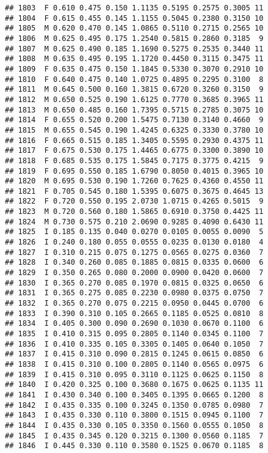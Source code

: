 \documentclass[
]{article}
\begin{document}
\begin{verbatim}
## 1803  F 0.610 0.475 0.150 1.1135 0.5195 0.2575 0.3005 11
## 1804  F 0.615 0.455 0.145 1.1155 0.5045 0.2380 0.3150 10
## 1805  M 0.620 0.470 0.145 1.0865 0.5110 0.2715 0.2565 10
## 1806  M 0.625 0.495 0.175 1.2540 0.5815 0.2860 0.3185  9
## 1807  M 0.625 0.490 0.185 1.1690 0.5275 0.2535 0.3440 11
## 1808  M 0.635 0.495 0.195 1.1720 0.4450 0.3115 0.3475 11
## 1809  F 0.635 0.475 0.150 1.1845 0.5330 0.3070 0.2910 10
## 1810  F 0.640 0.475 0.140 1.0725 0.4895 0.2295 0.3100  8
## 1811  M 0.645 0.500 0.160 1.3815 0.6720 0.3260 0.3150  9
## 1812  M 0.650 0.525 0.190 1.6125 0.7770 0.3685 0.3965 11
## 1813  M 0.650 0.485 0.160 1.7395 0.5715 0.2785 0.3075 10
## 1814  F 0.655 0.520 0.200 1.5475 0.7130 0.3140 0.4660  9
## 1815  M 0.655 0.545 0.190 1.4245 0.6325 0.3330 0.3780 10
## 1816  F 0.665 0.515 0.185 1.3405 0.5595 0.2930 0.4375 11
## 1817  F 0.675 0.530 0.175 1.4465 0.6775 0.3300 0.3890 10
## 1818  F 0.685 0.535 0.175 1.5845 0.7175 0.3775 0.4215  9
## 1819  F 0.695 0.550 0.185 1.6790 0.8050 0.4015 0.3965 10
## 1820  M 0.695 0.530 0.190 1.7260 0.7625 0.4360 0.4550 11
## 1821  F 0.705 0.545 0.180 1.5395 0.6075 0.3675 0.4645 13
## 1822  F 0.720 0.550 0.195 2.0730 1.0715 0.4265 0.5015  9
## 1823  M 0.720 0.560 0.180 1.5865 0.6910 0.3750 0.4425 11
## 1824  M 0.730 0.575 0.210 2.0690 0.9285 0.4090 0.6430 11
## 1825  I 0.185 0.135 0.040 0.0270 0.0105 0.0055 0.0090  5
## 1826  I 0.240 0.180 0.055 0.0555 0.0235 0.0130 0.0180  4
## 1827  I 0.310 0.215 0.075 0.1275 0.0565 0.0275 0.0360  7
## 1828  I 0.340 0.260 0.085 0.1885 0.0815 0.0335 0.0600  6
## 1829  I 0.350 0.265 0.080 0.2000 0.0900 0.0420 0.0600  7
## 1830  I 0.365 0.270 0.085 0.1970 0.0815 0.0325 0.0650  6
## 1831  I 0.365 0.275 0.085 0.2230 0.0980 0.0375 0.0750  7
## 1832  I 0.365 0.270 0.075 0.2215 0.0950 0.0445 0.0700  6
## 1833  I 0.390 0.310 0.105 0.2665 0.1185 0.0525 0.0810  8
## 1834  I 0.405 0.300 0.090 0.2690 0.1030 0.0670 0.1100  6
## 1835  I 0.410 0.315 0.095 0.2805 0.1140 0.0345 0.1100  7
## 1836  I 0.410 0.335 0.105 0.3305 0.1405 0.0640 0.1050  7
## 1837  I 0.415 0.310 0.090 0.2815 0.1245 0.0615 0.0850  6
## 1838  I 0.415 0.310 0.100 0.2805 0.1140 0.0565 0.0975  6
## 1839  I 0.415 0.310 0.095 0.3110 0.1125 0.0625 0.1150  8
## 1840  I 0.420 0.325 0.100 0.3680 0.1675 0.0625 0.1135 11
## 1841  I 0.430 0.340 0.100 0.3405 0.1395 0.0665 0.1200  8
## 1842  I 0.435 0.335 0.100 0.3245 0.1350 0.0785 0.0980  7
## 1843  I 0.435 0.330 0.110 0.3800 0.1515 0.0945 0.1100  7
## 1844  I 0.435 0.330 0.105 0.3350 0.1560 0.0555 0.1050  8
## 1845  I 0.435 0.345 0.120 0.3215 0.1300 0.0560 0.1185  7
## 1846  I 0.445 0.330 0.110 0.3580 0.1525 0.0670 0.1185  8

\end{verbatim}
\end{document}
